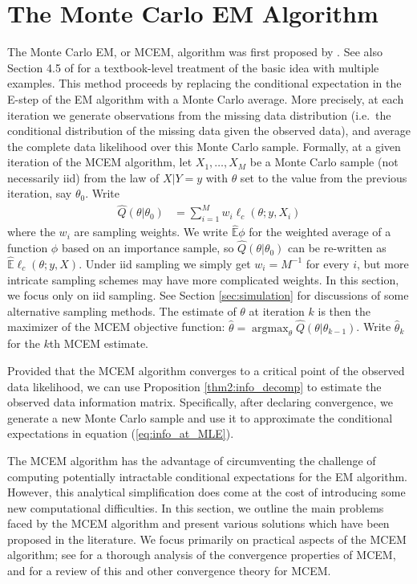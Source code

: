 \documentclass[11pt, oneside]{article}   	%
\newcommand{\bE}{\mathbb{E}}
\DeclareMathOperator*{\argmax}{argmax}
\begin{document}
\section{The Monte Carlo EM Algorithm}
\label{sec:MCEM}

The Monte Carlo EM, or MCEM, algorithm was first proposed by \citet{Wei90}. See also Section 4.5 of \citet{Tan96} for a textbook-level treatment of the basic idea with multiple examples. This method proceeds by replacing the conditional expectation in the E-step of the EM algorithm with a Monte Carlo average. More precisely, at each iteration we generate observations from the missing data distribution (i.e.\ the conditional distribution of the missing data given the observed data), and average the complete data likelihood over this Monte Carlo sample. Formally, at a given iteration of the MCEM algorithm, let $X_1,\ldots, X_M$ be a Monte Carlo sample (not necessarily iid) from the law of $X|Y=y$ with $\theta$ set to the value from the previous iteration, say $\theta_0$. Write
%
\begin{align}
    \hat{Q}(\theta|\theta_0) &= \sum_{i=1}^M w_i \ell_c(\theta; y, X_i) \label{eq:MCEM_objective}
\end{align}
%
where the $w_i$ are sampling weights. We write $\hat{\bE} \phi$ \index{$\hat{\bE}$} for the weighted average of a function $\phi$ based on an importance sample, so $\hat{Q}(\theta|\theta_0)$ can be re-written as $\hat{\bE} \ell_c (\theta; y, X)$. Under iid sampling we simply get $w_i = M^{-1}$ for every $i$, but more intricate sampling schemes may have more complicated weights. In this section, we focus only on iid sampling. See Section \ref{sec:simulation} for discussions of some alternative sampling methods. The estimate of $\theta$ at iteration $k$ is then the maximizer of the MCEM objective function: $\hat{\theta} = \argmax_\theta \hat{Q}(\theta|\theta_{k-1})$. Write $\hat{\theta}_{k}$ for the $k$th MCEM estimate. 

Provided that the MCEM algorithm converges to a critical point of the observed data likelihood, we can use Proposition \ref{thm2:info_decomp} to estimate the observed data information matrix. Specifically, after declaring convergence, we generate a new Monte Carlo sample and use it to approximate the conditional expectations in equation (\ref{eq:info_at_MLE}).

The MCEM algorithm has the advantage of circumventing the challenge of computing potentially intractable conditional expectations for the EM algorithm. However, this analytical simplification does come at the cost of introducing some new computational difficulties. In this section, we outline the main problems faced by the MCEM algorithm and present various solutions which have been proposed in the literature. We focus primarily on practical aspects of the MCEM algorithm; see \citet{For03} for a thorough analysis of the convergence properties of MCEM, and \citet{Nea13} for a review of this and other convergence theory for MCEM.
\end{document}
